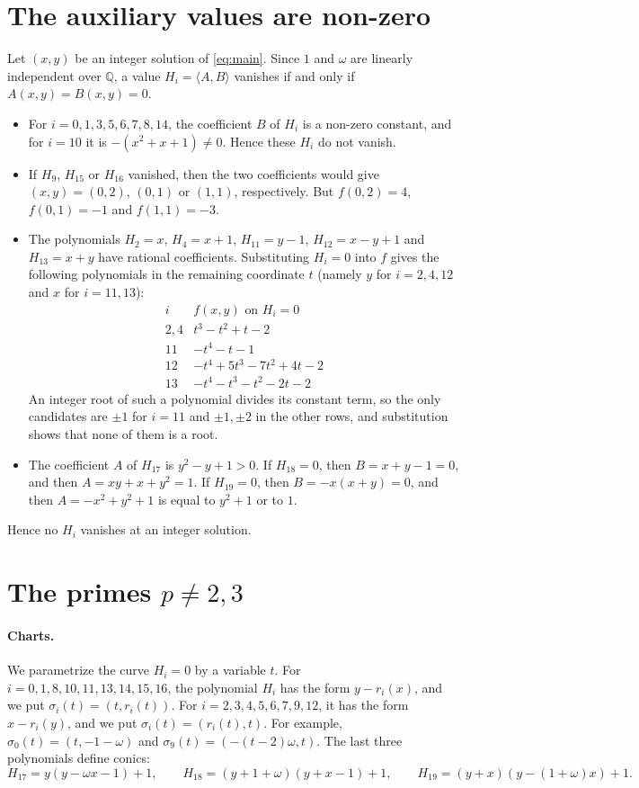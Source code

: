 \documentclass[11pt]{article}
\newcommand{\Q}{\mathbb{Q}}
\begin{document}
\section{The auxiliary values are non-zero}\label{sec:nonzero}

Let $(x,y)$ be an integer solution of \eqref{eq:main}. Since $1$ and $\omega$ are linearly independent over $\Q$, a value $H_i=\langle A,B\rangle$ vanishes if and only if $A(x,y)=B(x,y)=0$.
\begin{itemize}
\item For $i=0,1,3,5,6,7,8,14$, the coefficient $B$ of $H_i$ is a non-zero constant, and for $i=10$ it is $-(x^2+x+1)\neq0$. Hence these $H_i$ do not vanish.
\item If $H_9$, $H_{15}$ or $H_{16}$ vanished, then the two coefficients would give $(x,y)=(0,2)$, $(0,1)$ or $(1,1)$, respectively. But $f(0,2)=4$, $f(0,1)=-1$ and $f(1,1)=-3$.
\item The polynomials $H_2=x$, $H_4=x+1$, $H_{11}=y-1$, $H_{12}=x-y+1$ and $H_{13}=x+y$ have rational coefficients. Substituting $H_i=0$ into $f$ gives the following polynomials in the remaining coordinate $t$ (namely $y$ for $i=2,4,12$ and $x$ for $i=11,13$):
\[
\begin{array}{c|l}
i& f(x,y)\text{ on }H_i=0\\\hline
2,4&t^3-t^2+t-2\\
11&-t^4-t-1\\
12&-t^4+5t^3-7t^2+4t-2\\
13&-t^4-t^3-t^2-2t-2
\end{array}
\]
An integer root of such a polynomial divides its constant term, so the only candidates are $\pm1$ for $i=11$ and $\pm1,\pm2$ in the other rows, and substitution shows that none of them is a root.
\item The coefficient $A$ of $H_{17}$ is $y^2-y+1>0$. If $H_{18}=0$, then $B=x+y-1=0$, and then $A=xy+x+y^2=1$. If $H_{19}=0$, then $B=-x(x+y)=0$, and then $A=-x^2+y^2+1$ is equal to $y^2+1$ or to $1$.
\end{itemize}
Hence no $H_i$ vanishes at an integer solution.

\section{\texorpdfstring{The primes $p\neq2,3$}{The primes p other than 2 and 3}}\label{sec:good}

\paragraph{Charts.} We parametrize the curve $H_i=0$ by a variable $t$. For $i=0,1,8,10,11,13,14,15,16$, the polynomial $H_i$ has the form $y-r_i(x)$, and we put $\sigma_i(t)=(t,r_i(t))$. For $i=2,3,4,5,6,7,9,12$, it has the form $x-r_i(y)$, and we put $\sigma_i(t)=(r_i(t),t)$. For example, $\sigma_0(t)=(t,-1-\omega)$ and $\sigma_9(t)=(-(t-2)\omega,t)$. The last three polynomials define conics:
\[
H_{17}=y(y-\omega x-1)+1,\qquad H_{18}=(y+1+\omega)(y+x-1)+1,\qquad H_{19}=(y+x)(y-(1+\omega)x)+1.
\]
\end{document}
